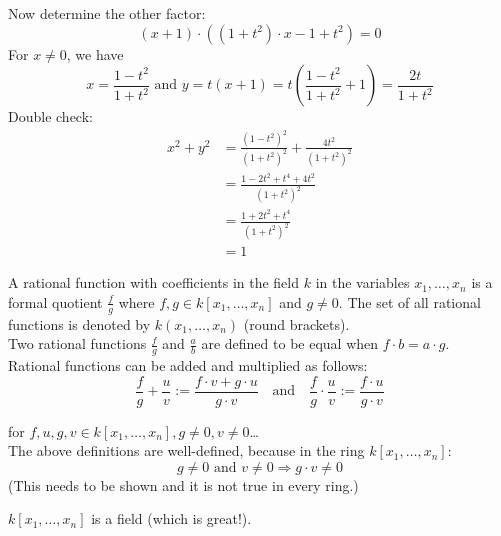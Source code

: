 \begin{example}[title = Example 1.3.3 (Quadratic Case) Continued]
  Now determine the other factor:
  \[(x + 1) \cdot ((1+t^2)\cdot x -1 + t^2) = 0\]
  For $x \neq 0$, we have \[x = \frac{1-t^2}{1+t^2} \text{ and } y = t(x+1) = t \left(\frac{1-t^2}{1+t^2} + 1\right) = \frac{2t}{1+t^2}\] 
  Double check: 
  \begin{align*}
    x^2 + y^2 & = \frac{(1-t^2)^2}{(1+t^2)^2} + \frac{4t^2}{(1+t^2)^2} \\
              & = \frac{1-2t^2+t^4 + 4t^2}{(1+t^2)^2}\\
              & = \frac{1+ 2t^2 + t^4}{(1 + t^2)^2} \\
              & = 1
  \end{align*}
\end{example} 

\begin{definition}[title = Definition 1.3.4 (Rational Functions)]
  A rational function with coefficients in the field $k$ in the variables $x_1, \ldots, x_n$ is a formal quotient $\frac{f}{g}$ where $f, g \in k[x_1, \dots, x_n]$ 
  and $g \neq 0$. The set of all rational functions is denoted by $k(x_1, \ldots, x_n)$ (round brackets). \\
  
  Two rational functions $\frac{f}{g}$ and $\frac{a}{b}$ are defined to be equal when $f \cdot b = a \cdot g$. \\

  Rational functions can be added and multiplied as follows:
\[\frac{f}{g} + \frac{u}{v} :=\frac{f \cdot v + g \cdot u}{g \cdot v}  \ \ \ \text{ and } \ \ \  \frac{f}{g} \cdot \frac{u}{v}:= \frac{f \cdot u}{g \cdot v} \]

  for $f, u, g, v \in k[x_1, \dots, x_n], g \neq 0, v \neq 0$\dots \\

  The above definitions are well-defined, because in the ring $k[x_1, \dots, x_n]$:
  \[g \neq 0 \text{ and } v \neq 0 \Rightarrow g \cdot v \neq 0\] 
  (This needs to be shown and it is not true in every ring.)
\end{definition}

\begin{remark}[title = Remark 1.3.5]
  $k[x_1, \dots, x_n]$ is a field (which is great!). 
\end{remark}

